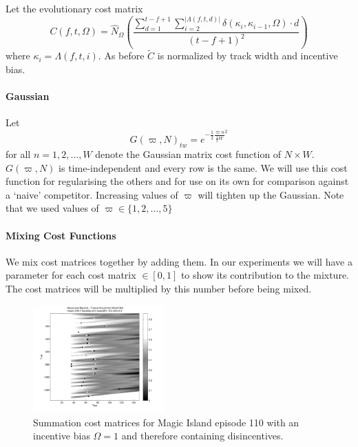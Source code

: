 \documentclass[twocolumn]{article}
\begin{document}
	Let the evolutionary cost matrix
	\begin{dmath*} C(f, t, \Omega) =  
		\hat N_\Omega\left(\frac{
		\sum_{d=1}^{t-f+1} 
		\sum_{i=2}^{|\Lambda( f,t,d )|}  \delta( \kappa_{i}, \kappa_{i-1}, \Omega ) \cdot d
	}{(t-f+1)^2}\right)
	\end{dmath*}  where  $\kappa_i=\Lambda( f,t,i )$. As before $\tilde C$ is normalized by track width and incentive bias.


	\paragraph{Gaussian}
	Let \[
	G( \varpi, N )_{tw} = e^{ - \frac{1}{2} \frac{\varpi n}{ \frac{1}{2} W}^2  }
	\] for all $n=1,2,\ldots,W$ denote the Gaussian matrix cost function of $N\times W$. $G( \varpi, N )$ is time-independent and every row is the same. We will use this cost function for regularising the others and for use on its own for comparison against a `naive' competitor. Increasing values of $\varpi$ will tighten up the Gaussian. Note that we used values of $\varpi \in \{1,2,\ldots,5\}$
	



	
	
	\paragraph{Mixing Cost Functions}
	
	We mix cost matrices together by adding them. In our experiments we will have a parameter for each cost matrix $\in [0,1]$ to show its contribution to the mixture. The cost matrices will be multiplied by this number before being mixed. 
	
		\begin{figure}
			\centering
			\includegraphics[width=0.45\textwidth]{images/cmsumib0}
			\caption{Summation cost matrices for Magic Island episode 110 with an incentive bias $\Omega=1$ and therefore containing disincentives. }
			\label{fig:cmsumib1}
		\end{figure} 
		
\end{document}
